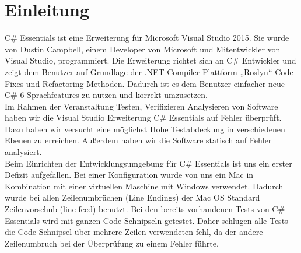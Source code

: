 \section{Einleitung}
C\# Essentials ist eine Erweiterung für Microsoft Visual Studio 2015. Sie wurde von Dustin Campbell, einem Developer von Microsoft und Mitentwickler von Visual Studio, programmiert.\cite{csharpEssentials} Die Erweiterung richtet sich an C\# Entwickler und zeigt dem Benutzer auf Grundlage der .NET Compiler Plattform „Roslyn“ Code-Fixes und Refactoring-Methoden. Dadurch ist es dem Benutzer einfacher neue C\# 6 Sprachfeatures zu nutzen und korrekt umzusetzen.\\
Im Rahmen der Veranstaltung \glqq Testen, Verifizieren Analysieren von Software\grqq{} haben wir die Visual Studio Erweiterung C\# Essentials auf Fehler überprüft. Dazu haben wir versucht eine möglichst Hohe Testabdeckung in verschiedenen Ebenen zu erreichen. Außerdem haben wir die Software statisch auf Fehler analysiert.\\
Beim Einrichten der Entwicklungsumgebung für C\# Essentials ist uns ein erster Defizit aufgefallen. Bei einer Konfiguration wurde von uns ein Mac in Kombination mit einer virtuellen Maschine mit Windows verwendet. Dadurch wurde bei allen Zeilenumbrüchen (Line Endings) der Mac OS Standard Zeilenvorschub (line feed) benutzt. Bei den bereits vorhandenen Tests von C\# Essentials wird mit ganzen Code Schnipseln getestet. Daher schlugen alle Tests die Code Schnipsel über mehrere Zeilen verwendeten fehl, da der andere Zeilenumbruch bei der Überprüfung zu einem Fehler führte.
